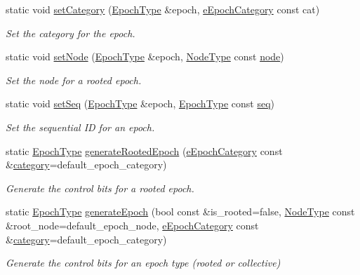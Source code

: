 \begin{DoxyCompactItemize}
static void \hyperlink{structvt_1_1epoch_1_1_epoch_manip_a5ef6f747225cf046cff1fb39945fa547}{set\+Category} (\hyperlink{namespacevt_a985a5adf291c34a3ca263b3378388236}{Epoch\+Type} \&epoch, \hyperlink{namespacevt_1_1epoch_a956abe0aceef0d10a988de8acb002c7c}{e\+Epoch\+Category} const cat)
\begin{DoxyCompactList}\small\item\em Set the category for the {\ttfamily epoch}. \end{DoxyCompactList}\item 
static void \hyperlink{structvt_1_1epoch_1_1_epoch_manip_a5c4c075234fc7c263b0eabf09e85ef05}{set\+Node} (\hyperlink{namespacevt_a985a5adf291c34a3ca263b3378388236}{Epoch\+Type} \&epoch, \hyperlink{namespacevt_a866da9d0efc19c0a1ce79e9e492f47e2}{Node\+Type} const \hyperlink{structvt_1_1epoch_1_1_epoch_manip_a7120f73ef583ab8f061334fc0bc519c3}{node})
\begin{DoxyCompactList}\small\item\em Set the node for a rooted {\ttfamily epoch}. \end{DoxyCompactList}\item 
static void \hyperlink{structvt_1_1epoch_1_1_epoch_manip_af1fb573c17b2bd4e6a789702cf0392dc}{set\+Seq} (\hyperlink{namespacevt_a985a5adf291c34a3ca263b3378388236}{Epoch\+Type} \&epoch, \hyperlink{namespacevt_a985a5adf291c34a3ca263b3378388236}{Epoch\+Type} const \hyperlink{structvt_1_1epoch_1_1_epoch_manip_ac34685702f19dde2f5bc25fcb43ec038}{seq})
\begin{DoxyCompactList}\small\item\em Set the sequential ID for an {\ttfamily epoch}. \end{DoxyCompactList}\item 
static \hyperlink{namespacevt_a985a5adf291c34a3ca263b3378388236}{Epoch\+Type} \hyperlink{structvt_1_1epoch_1_1_epoch_manip_ac1a8c8f8d1799c05520a3bb6d2fcf6bf}{generate\+Rooted\+Epoch} (\hyperlink{namespacevt_1_1epoch_a956abe0aceef0d10a988de8acb002c7c}{e\+Epoch\+Category} const \&\hyperlink{structvt_1_1epoch_1_1_epoch_manip_aa61d47033545df147c01036211c4cabe}{category}=default\+\_\+epoch\+\_\+category)
\begin{DoxyCompactList}\small\item\em Generate the control bits for a rooted epoch. \end{DoxyCompactList}\item 
static \hyperlink{namespacevt_a985a5adf291c34a3ca263b3378388236}{Epoch\+Type} \hyperlink{structvt_1_1epoch_1_1_epoch_manip_a6e96213acd8e0a160a4d4b9ab6a64eaf}{generate\+Epoch} (bool const \&is\+\_\+rooted=false, \hyperlink{namespacevt_a866da9d0efc19c0a1ce79e9e492f47e2}{Node\+Type} const \&root\+\_\+node=default\+\_\+epoch\+\_\+node, \hyperlink{namespacevt_1_1epoch_a956abe0aceef0d10a988de8acb002c7c}{e\+Epoch\+Category} const \&\hyperlink{structvt_1_1epoch_1_1_epoch_manip_aa61d47033545df147c01036211c4cabe}{category}=default\+\_\+epoch\+\_\+category)
\begin{DoxyCompactList}\small\item\em Generate the control bits for an epoch type (rooted or collective) \end{DoxyCompactList}\end{DoxyCompactItemize}
